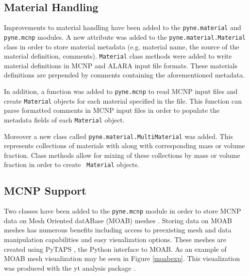 \documentclass{ansconf}
\begin{document}
\subsection{Material Handling}

Improvements to material handling have been added to the \texttt{pyne.material}
and \texttt{pyne.mcnp} modules. A new attribute was added to the
\texttt{pyne.material.Material} class in order to store material metadata (e.g.
material name, the source of the material definition, comments).
\texttt{Material} class methods were added to write material definitions in MCNP
and ALARA \cite{wilson_alara:_1999} input file formats.  These materials
definitions are prepended by comments containing the aforementioned metadata. 

In addition, a function was added to \texttt{pyne.mcnp} to read MCNP input files and
create \texttt{Material} objects for each material specified in the file. This
function can parse formatted comments in MCNP input files in order to
populate the metadata fields of each \texttt{Material} object.

Moreover a new class called \texttt{pyne.material.MultiMaterial} was added.  This
represents collections of materials with along with corresponding mass or
volume fraction.  Class methods allow for mixing of these collections by mass
or volume fraction in order to create \texttt{ Material} objects.

\subsection{MCNP Support}

Two classes have been added to the \texttt{pyne.mcnp} module in order to store
MCNP data on Mesh Oriented datABase (MOAB) meshes \cite{tautges_moab:_2004}.
Storing data on MOAB meshes has numerous benefits including access to preexisting
mesh and data manipulation capabilities and easy visualization options. These
meshes are created using PyTAPS \cite{pytaps}, the Python interface to MOAB.
As an example of MOAB mesh visualization may be seen in Figure \ref{moabexp}.
This visualization was produced with the yt analysis package \cite{ytpaper}.
\end{document}
